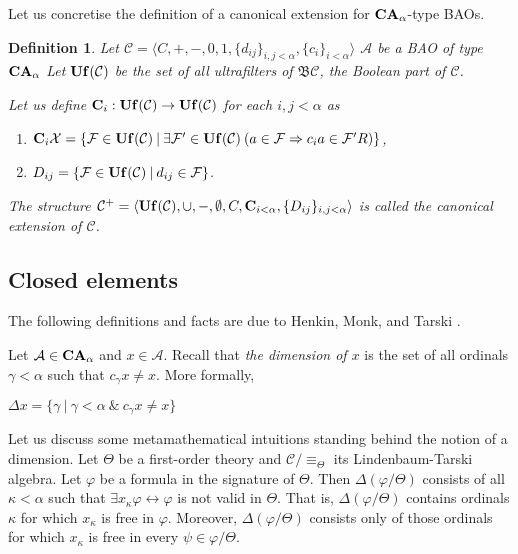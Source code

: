 \documentclass[a4paper]{article}
\theoremstyle{defin}
\newtheorem{defin}{Definition}
\theoremstyle{theorem}
\theoremstyle{prop}
\theoremstyle{lemma}
\theoremstyle{fact}
\theoremstyle{ex}
\theoremstyle{col}
\begin{document}
Let us concretise the definition of a canonical extension for ${\bf CA}_{\alpha}$-type BAOs.

\begin{defin}
  Let $\mathcal{C} = \langle C, +, -, 0, 1, \{ d_{ij} \}_{i, j < \alpha}, \{c_i\}_{i < \alpha} \rangle$ $\mathcal{A}$ be a BAO of type ${\bf CA}_{\alpha}$ Let ${\bf Uf}(\mathcal{C})$ be the set of all ultrafilters of $\mathfrak{B}\mathcal{C}$, the Boolean part of $\mathcal{C}$.

  Let us define ${\bf C}_{i} : {\bf Uf}(\mathcal{C}) \to {\bf Uf}(\mathcal{C})$ for each $i, j < \alpha$ as
  \begin{enumerate}
\item ${\bf C}_{i} \mathcal{X} = \{ \mathcal{F} \in {\bf Uf}(\mathcal{C}) \: | \: \exists \mathcal{F}' \in {\bf Uf}(\mathcal{C}) \: (a \in \mathcal{F} \Rightarrow c_i a \in \mathcal{F}' R)\}$,
\item $D_{ij} = \{ \mathcal{F} \in {\bf Uf}(\mathcal{C}) \: | \: d_{ij} \in \mathcal{F} \}$.
  \end{enumerate}
  The structure $\mathcal{C}^{+} = \langle  {\bf Uf}(\mathcal{C}), \cup, -, \emptyset, C, {\bf C}_{i < \alpha}, \{D_{ij}\}_{i, j < \alpha} \rangle$ is called the canonical extension of $\mathcal{C}$.
\end{defin}

\subsection{Closed elements}

The following definitions and facts are due to Henkin, Monk, and Tarski \cite{henkin1971cylindric}.

Let $\mathcal{A} \in {\bf CA}_{\alpha}$ and $x \in \mathcal{A}$. Recall that \emph{the dimension of $x$}
is the set of all ordinals $\gamma < \alpha$ such that $c_\gamma x \neq x$. More formally,
\begin{center}
  $\Delta x = \{ \gamma \: | \: \gamma < \alpha \: \& \: c_\gamma x \neq x\}$
\end{center}

Let us discuss some metamathematical intuitions standing behind the notion of a dimension. Let $\Theta$ be a first-order theory and $\mathcal{C}/\equiv_{\Theta}$ its Lindenbaum-Tarski algebra. Let $\varphi$ be a formula in the signature of $\Theta$. Then $\Delta(\varphi/\Theta)$ consists of all $\kappa < \alpha$ such that $\exists x_{\kappa} \varphi \leftrightarrow \varphi$ is not valid in $\Theta$.
That is, $\Delta(\varphi/\Theta)$ contains ordinals $\kappa$ for which $x_{\kappa}$ is free in $\varphi$. Moreover, $\Delta(\varphi/\Theta)$ consists only of those ordinals for which $x_{\kappa}$ is free in every $\psi \in \varphi/\Theta$.
\end{document}
